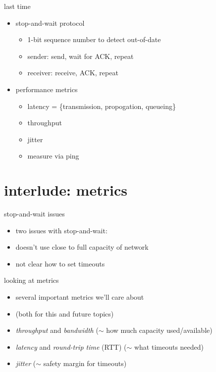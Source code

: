 \date{}
\title{}
\date{}
\usepackage{pgfplots}
\pgfplotsset{compat=1.16}

\begin{frame}
    \titlepage
\end{frame}

\begin{frame}{last time}
    \begin{itemize}
    \item stop-and-wait protocol
        \begin{itemize}
        \item 1-bit sequence number to detect out-of-date
        \item sender: send, wait for ACK, repeat
        \item receiver: receive, ACK, repeat
        \end{itemize}
    \item performance metrics
        \begin{itemize}
        \item latency = \{transmission, propogation, queueing\}
        \item throughput
        \item jitter
        \item measure via ping
        \end{itemize}
    \end{itemize}
\end{frame}

\section{interlude: metrics}
\begin{frame}{stop-and-wait issues}
    \begin{itemize}
    \item two issues with stop-and-wait:
    \vspace{.5cm}
    \item doesn't use close to full capacity of network
    \item not clear how to set timeouts
    \end{itemize}
\end{frame}

\begin{frame}{looking at metrics}
    \begin{itemize}
    \item several important metrics we'll care about
    \item (both for this and future topics)
    \vspace{.5cm}
    \item<2-> \textit{throughput} and \textit{bandwidth} ($\sim$ how much capacity used/available)
    \item<2-> \textit{latency} and \textit{round-trip time} (RTT) ($\sim$ what timeouts needed)
    \item<2-> \textit{jitter} ($\sim$ safety margin for timeouts)
    \end{itemize}
\end{frame}

